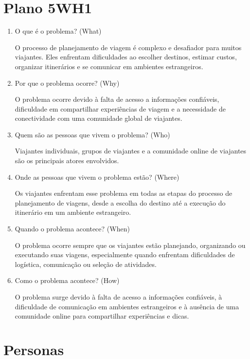 \documentclass{article}
\begin{document}
\section{Plano 5WH1}

\begin{enumerate}
      \item O que é o problema? (What)

            O processo de planejamento de viagem é complexo e desafiador para muitos viajantes. Eles enfrentam dificuldades ao escolher destinos, estimar custos, organizar itinerários e se comunicar em ambientes estrangeiros.
      \item Por que o problema ocorre? (Why)

            O problema ocorre devido à falta de acesso a informações confiáveis, dificuldade em compartilhar experiências de viagem e a necessidade de conectividade com uma comunidade global de viajantes.
      \item Quem são as pessoas que vivem o problema? (Who)

            Viajantes individuais, grupos de viajantes e a comunidade online de viajantes são os principais atores envolvidos.
      \item Onde as pessoas que vivem o problema estão? (Where)

            Os viajantes enfrentam esse problema em todas as etapas do processo de planejamento de viagens, desde a escolha do destino até a execução do itinerário em um ambiente estrangeiro.
      \item Quando o problema acontece? (When)

            O problema ocorre sempre que os viajantes estão planejando, organizando ou executando suas viagens, especialmente quando enfrentam dificuldades de logística, comunicação ou seleção de atividades.
      \item Como o problema acontece? (How)

            O problema surge devido à falta de acesso a informações confiáveis, à dificuldade de comunicação em ambientes estrangeiros e à ausência de uma comunidade online para compartilhar experiências e dicas.

\end{enumerate}

\section{Personas}
\end{document}
